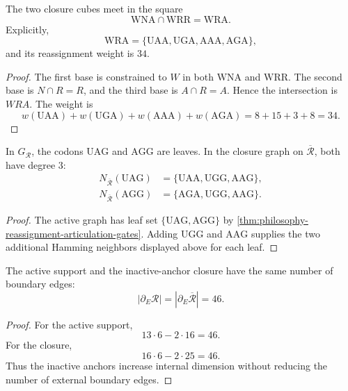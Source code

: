 \begin{theorem}
\label{thm:philosophy-hinge-square}
The two closure cubes meet in the square
$$
  \mathrm{WNA}\cap\mathrm{WRR}=\mathrm{WRA}.
$$
Explicitly,
$$
  \mathrm{WRA}
  =
  \{\mathrm{UAA},\mathrm{UGA},\mathrm{AAA},\mathrm{AGA}\},
$$
and its reassignment weight is $34$.
\end{theorem}
\begin{proof}
The first base is constrained to $W$ in both $\mathrm{WNA}$ and
$\mathrm{WRR}$. The second base is $N\cap R=R$, and the third base is
$A\cap R=A$. Hence the intersection is $WRA$. The weight is
$$
  w(\mathrm{UAA})+w(\mathrm{UGA})+w(\mathrm{AAA})+w(\mathrm{AGA})
  =
  8+15+3+8=34.
$$
\end{proof}

\begin{theorem}
\label{thm:philosophy-inactive-anchors-eliminate-leaves}
In $G_{\mathcal{R}}$, the codons $\mathrm{UAG}$ and $\mathrm{AGG}$ are
leaves. In the closure graph on $\overline{\mathcal{R}}$, both have
degree $3$:
$$
\begin{aligned}
  N_{\overline{\mathcal{R}}}(\mathrm{UAG})
    &=\{\mathrm{UAA},\mathrm{UGG},\mathrm{AAG}\},\\
  N_{\overline{\mathcal{R}}}(\mathrm{AGG})
    &=\{\mathrm{AGA},\mathrm{UGG},\mathrm{AAG}\}.
\end{aligned}
$$
\end{theorem}
\begin{proof}
The active graph has leaf set $\{\mathrm{UAG},\mathrm{AGG}\}$ by
\autoref{thm:philosophy-reassignment-articulation-gates}. Adding
$\mathrm{UGG}$ and $\mathrm{AAG}$ supplies the two additional Hamming
neighbors displayed above for each leaf.
\end{proof}

\begin{theorem}
\label{thm:philosophy-boundary-edge-comparison}
The active support and the inactive-anchor closure have the same number
of boundary edges:
$$
  |\partial_{E}\mathcal{R}|
  =
  |\partial_{E}\overline{\mathcal{R}}|
  =
  46.
$$
\end{theorem}
\begin{proof}
For the active support,
$$
  13\cdot6-2\cdot16=46.
$$
For the closure,
$$
  16\cdot6-2\cdot25=46.
$$
Thus the inactive anchors increase internal dimension without reducing
the number of external boundary edges.
\end{proof}

